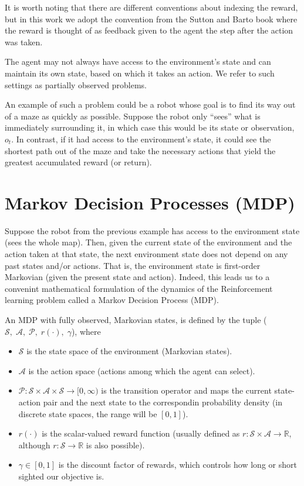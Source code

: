 \documentclass{report}
\newcommand{\reals}{\mbox{\(\mathbb R\)}}
\numberwithin{equation}{section}
\numberwithin{figure}{section}
\numberwithin{table}{section}
\numberwithin{algorithm}{section}
\begin{document}
It is worth noting that there are 
different conventions about indexing the reward, but in this work 
we adopt the convention from the Sutton and Barto book 
\citep{Sutton1998} where the reward is thought of as feedback 
given to the agent the step after the action was taken.

The agent may not always have access 
to the environment's state and can maintain its own state, based 
on which it takes an action. We refer to such settings as partially 
observed problems. 

An example of such a problem could be a robot 
whose goal is to find its way out of a maze as quickly as possible.
Suppose the robot only ``sees'' what is 
immediately surrounding it, in which case this would be its state 
or observation, $o_t$. 
In contrast, if it had access to the environment's state, it could 
see the shortest path out of the maze and take the necessary actions 
that yield the greatest accumulated reward (or return).

\section{Markov Decision Processes (MDP)}
\label{sec:RLMDP}
Suppose the robot from the previous example has access to the 
environment state (sees the whole map). Then, given the 
current state of the environment 
and the action taken 
at that state, the next environment state does not depend on any 
past states and/or actions. That is, the 
environment state is first-order Markovian 
(given the present state and action). Indeed, this 
leads us to a convenint 
mathematical formulation of the dynamics of the 
Reinforcement learning problem called 
a Markov Decision Process (MDP).

An MDP with fully observed, Markovian states, is defined by the tuple 
($\mathcal{S},\; \mathcal{A},\; \mathcal{P},\; r(\cdot),\; \gamma$), where
\begin{itemize}
  \item $\mathcal{S}$ is the state space of the environment 
    (Markovian states).
  \item $\mathcal{A}$ is the action space (actions among which 
    the agent can select).
  \item $\mathcal{P}:\mathcal{S}\times \mathcal{A}\times \mathcal{S}\rightarrow [0, \infty)$ 
    is the transition operator and maps 
    the current state-action pair and the next state to the 
    correspondin probability density (in discrete state spaces, 
    the range will be $[0, 1]$).
  \item $r(\cdot)$ is the scalar-valued reward function 
    (usually defined as $r:\mathcal{S}\times \mathcal{A}\rightarrow \reals$, 
    although $r:\mathcal{S}\rightarrow \reals$ is also possible).
  \item $\gamma\in [0, 1]$ is the discount factor of rewards, which controls 
    how long or short sighted our objective is.
\end{itemize} 
\end{document}
